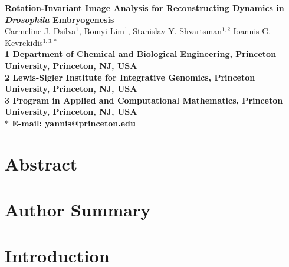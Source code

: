 \documentclass[10pt]{article}
\date{}
\begin{document}
\begin{flushleft}
{\Large
\textbf{Rotation-Invariant Image Analysis for Reconstructing Dynamics in {\em Drosophila} Embryogenesis}
}
\\
Carmeline J. Dsilva$^{1}$,
Bomyi Lim$^{1}$,
Stanislav Y. Shvartsman$^{1,2}$
Ioannis G. Kevrekidis$^{1,3,\ast}$
\\
\bf{1} Department of Chemical and Biological Engineering, Princeton University, Princeton, NJ, USA
\\
\bf{2} Lewis-Sigler Institute for Integrative Genomics, Princeton University, Princeton, NJ, USA
\\
\bf{3} Program in Applied and Computational Mathematics, Princeton University, Princeton, NJ, USA
\\
$\ast$ E-mail: yannis@princeton.edu
\end{flushleft}

\section*{Abstract}

\section*{Author Summary}

\section*{Introduction}
\end{document}
